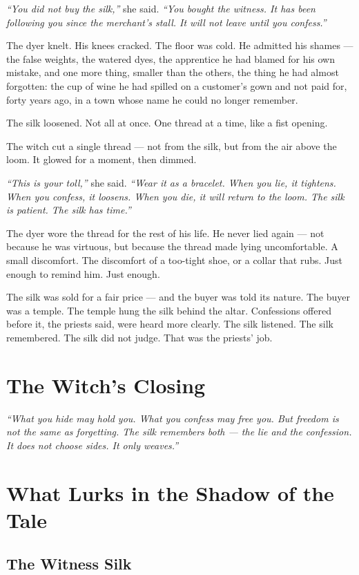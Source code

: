 \textit{``You did not buy the silk,''} she said. \textit{``You bought the witness. It has been following you since the merchant's stall. It will not leave until you confess.''}

The dyer knelt. His knees cracked. The floor was cold. He admitted his shames --- the false weights, the watered dyes, the apprentice he had blamed for his own mistake, and one more thing, smaller than the others, the thing he had almost forgotten: the cup of wine he had spilled on a customer's gown and not paid for, forty years ago, in a town whose name he could no longer remember.

The silk loosened. Not all at once. One thread at a time, like a fist opening.

The witch cut a single thread --- not from the silk, but from the air above the loom. It glowed for a moment, then dimmed.

\textit{``This is your toll,''} she said. \textit{``Wear it as a bracelet. When you lie, it tightens. When you confess, it loosens. When you die, it will return to the loom. The silk is patient. The silk has time.''}

The dyer wore the thread for the rest of his life. He never lied again --- not because he was virtuous, but because the thread made lying uncomfortable. A small discomfort. The discomfort of a too-tight shoe, or a collar that rubs. Just enough to remind him. Just enough.

The silk was sold for a fair price --- and the buyer was told its nature. The buyer was a temple. The temple hung the silk behind the altar. Confessions offered before it, the priests said, were heard more clearly. The silk listened. The silk remembered. The silk did not judge. That was the priests' job.

\section*{The Witch's Closing}

\textit{``What you hide may hold you. What you confess may free you. But freedom is not the same as forgetting. The silk remembers both --- the lie and the confession. It does not choose sides. It only weaves.''}

\section*{What Lurks in the Shadow of the Tale}

\subsection*{The Witness Silk}

